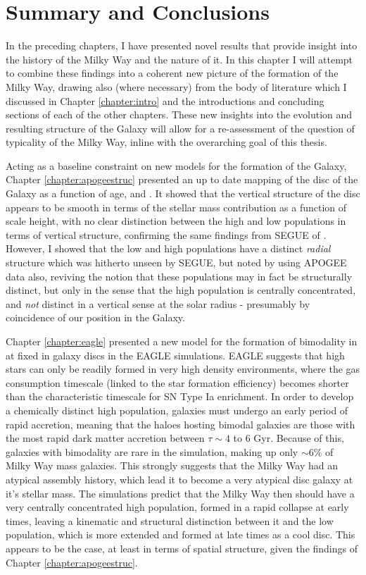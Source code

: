 \chapter{Summary and Conclusions}

In the preceding chapters, I have presented novel results that provide insight into the history of the Milky Way and the nature of it. In this chapter I will attempt to combine these findings into a coherent new picture of the formation of the Milky Way, drawing also (where necessary) from the body of literature which I discussed in Chapter \ref{chapter:intro} and the introductions and concluding sections of each of the other chapters. These new insights into the evolution and resulting structure of the Galaxy will allow for a re-assessment of the question of typicality of the Milky Way, inline with the overarching goal of this thesis. 

Acting as a baseline constraint on new models for the formation of the Galaxy, Chapter \ref{chapter:apogeestruc} presented an up to date mapping of the disc of the Galaxy as a function of age, \feh{} and \afe{}. It showed that the vertical structure of the disc appears to be smooth in terms of the stellar mass contribution as a function of scale height, with no clear distinction between the high and low \afe{} populations in terms of vertical structure, confirming the same findings from SEGUE of \citet{2012ApJ...751..131B}. However, I showed that the low and high \afe{} populations have a distinct \emph{radial} structure which was hitherto unseen by SEGUE, but noted by \citet{2016ApJ...823...30B} using APOGEE data also, reviving the notion that these populations may in fact be structurally distinct, but only in the sense that the high \afe{} population is centrally concentrated, and \emph{not} distinct in a vertical sense at the solar radius - presumably by coincidence of our position in the Galaxy. 

Chapter \ref{chapter:eagle} presented a new model for the formation of bimodality in \afe{} at fixed \feh{} in galaxy discs in the EAGLE simulations. EAGLE suggests that high \afe{} stars can only be readily formed in very high density environments, where the gas consumption timescale (linked to the star formation efficiency) becomes shorter than the characteristic timescale for SN Type Ia enrichment. In order to develop a chemically distinct high \afe{} population, galaxies must undergo an early period of rapid accretion, meaning that the haloes hosting bimodal galaxies are those with the most rapid dark matter accretion between $\tau \sim 4$ to $6$ Gyr. Because of this, galaxies with \afe{} bimodality are rare in the simulation, making up only $\sim 6\%$ of Milky Way mass galaxies. This strongly suggests that the Milky Way had an atypical assembly history, which lead it to become a very atypical disc galaxy at it's stellar mass. The simulations predict that the Milky Way then should have a very centrally concentrated high \afe{} population, formed in a rapid collapse at early times, leaving a kinematic and structural distinction between it and the low \afe{} population, which is more extended and formed at late times as a cool disc. This appears to be the case, at least in terms of spatial structure, given the findings of Chapter \ref{chapter:apogeestruc}.

